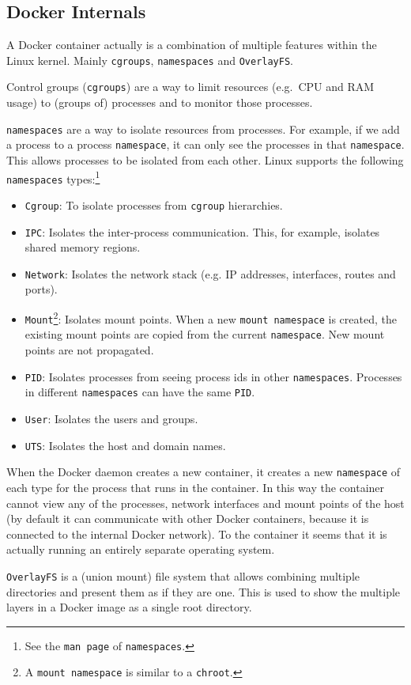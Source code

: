 \subsection{Docker Internals}\label{subsubsection:internals}
A Docker container actually is a combination of multiple features within the Linux kernel.
Mainly \lstinline{cgroups}, \lstinline{namespaces} and \lstinline{OverlayFS}.

\medskip

Control groups (\lstinline{cgroups}) are a way to limit resources (e.g.\ CPU and RAM usage) to (groups of) processes and to monitor those processes.

\medskip

\lstinline{namespaces} are a way to isolate resources from processes. For example, if we add a process to a process \lstinline{namespace}, it can only see the processes in that \lstinline{namespace}. This allows processes to be isolated from each other. Linux supports the following \lstinline{namespaces} types:\footnote{See the \lstinline{man page} of \lstinline{namespaces}.}
\begin{itemize}
    \item \lstinline{Cgroup}: To isolate processes from \lstinline{cgroup} hierarchies.
    \item \lstinline{IPC}: Isolates the inter-process communication. This, for example, isolates shared memory regions.
    \item \lstinline{Network}: Isolates the network stack (e.g. IP addresses, interfaces, routes and ports).
    \item \lstinline{Mount}\footnote{A \lstinline{mount namespace} is similar to a \lstinline{chroot}.}: Isolates mount points. When a new \lstinline{mount namespace} is created, the existing mount points are copied from the current \lstinline{namespace}. New mount points are not propagated.
    \item \lstinline{PID}: Isolates processes from seeing process ids in other \lstinline{namespaces}. Processes in different \lstinline{namespaces} can have the same \lstinline{PID}.
    \item \lstinline{User}: Isolates the users and groups.
    \item \lstinline{UTS}: Isolates the host and domain names.
\end{itemize}

When the Docker daemon creates a new container, it creates a new \lstinline{namespace} of each type for the process that runs in the container. In this way the container cannot view any of the processes, network interfaces and mount points of the host (by default it can communicate with other Docker containers, because it is connected to the internal Docker network). To the container it seems that it is actually running an entirely separate operating system.

\medskip

\lstinline{OverlayFS} is a (union mount) file system that allows combining multiple directories and present them as if they are one. This is used to show the multiple layers in a Docker image as a single root directory.
